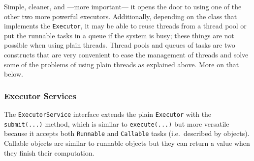 Simple, cleaner, and ---more important--- it opens the door to using
one of the other two more powerful executors. Additionally, depending
on the class that implements the \verb+Executor+, it may be able to
reuse threads from a thread pool or put the runnable tasks in a queue
if the system is busy; these things are not possible when using plain
threads. Thread pools and queues of tasks are two constructs that
are very convenient to ease the management of threads and solve some
of the problems of using plain threads as explained above. More on
that below. 

\subsubsection{Executor Services}
\label{sec:executor-services}

The \verb+ExecutorService+ interface extends the plain \verb+Executor+
with the \verb+submit(...)+ method, which is similar to
\verb+execute(...)+ but more versatile because it accepts both
\verb+Runnable+ and \verb+Callable+ tasks (i.e.~described by
objects). Callable objects are similar to runnable objects but they
can return a value when they finish their computation. 